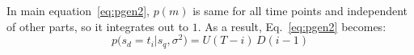\documentclass{article}
\begin{document}
In main equation~\ref{eq:pgen2}, $p(m)$ is same for all time
points and independent of other parts, so it integrates out to $1$. As
a result, Eq.~\ref{eq:pgen2} becomes:
%
\begin{equation}\label{eq:newpgen2}
p\big(s_{d} = t_{i} | s_{q}, \sigma^{2} \big) = U(T-i)\,D(i-1)
\end{equation}



\end{document}
